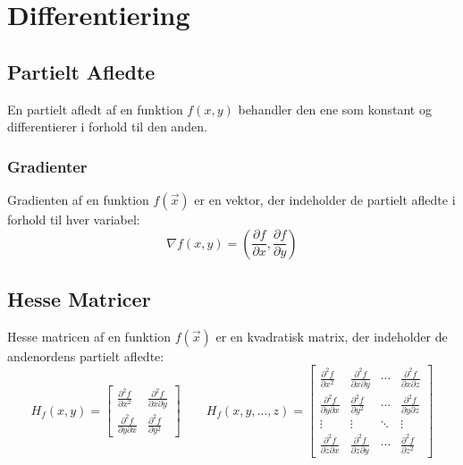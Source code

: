 \section{Differentiering}

\subsection{Partielt Afledte}
En partielt afledt af en funktion $f(x,y)$ behandler den ene som konstant og differentierer i forhold til den anden.

\subsubsection{Gradienter}
Gradienten af en funktion $f(\vec x)$ er en vektor, der indeholder de partielt afledte i forhold til hver variabel:
\[
    \nabla f(x,y) = \left( \frac{\partial f}{\partial x}, \frac{\partial f}{\partial y} \right)
\]

\subsection{Hesse Matricer}
Hesse matricen af en funktion $f(\vec x)$ er en kvadratisk matrix, der indeholder de andenordens partielt afledte:
\begingroup
\renewcommand*{\arraystretch}{1.5}
\[
    H_f(x,y) = \begin{bmatrix}
        \frac{\partial^2 f}{\partial x^2} & \frac{\partial^2 f}{\partial x \partial y} \\
        \frac{\partial^2 f}{\partial y \partial x} & \frac{\partial^2 f}{\partial y^2}
    \end{bmatrix}
    \qquad
    H_f(x,y,\ldots,z) = \begin{bmatrix}
        \frac{\partial^2 f}{\partial x^2} & \frac{\partial^2 f}{\partial x \partial y} & \cdots & \frac{\partial^2 f}{\partial x \partial z} \\
        \frac{\partial^2 f}{\partial y \partial x} & \frac{\partial^2 f}{\partial y^2} & \cdots & \frac{\partial^2 f}{\partial y \partial z} \\
        \vdots & \vdots & \ddots & \vdots \\
        \frac{\partial^2 f}{\partial z \partial x} & \frac{\partial^2 f}{\partial z \partial y} & \cdots & \frac{\partial^2 f}{\partial z^2}
    \end{bmatrix}
\]
\endgroup


